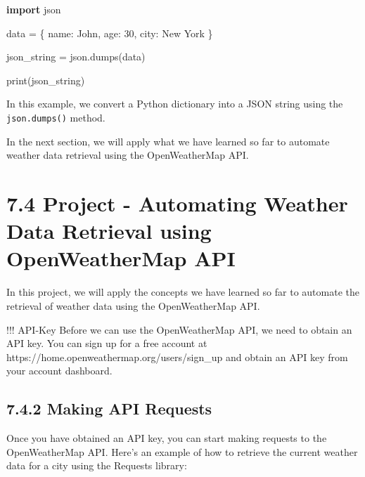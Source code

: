 \documentclass[
  paper=a4,
  ,captions=tableheading
]{scrartcl}
\newenvironment{Shaded}{}{}
\newcommand{\BuiltInTok}[1]{\textcolor[rgb]{0.00,0.50,0.00}{#1}}
\newcommand{\DecValTok}[1]{\textcolor[rgb]{0.25,0.63,0.44}{#1}}
\newcommand{\ImportTok}[1]{\textcolor[rgb]{0.00,0.50,0.00}{\textbf{#1}}}
\newcommand{\NormalTok}[1]{#1}
\newcommand{\OperatorTok}[1]{\textcolor[rgb]{0.40,0.40,0.40}{#1}}
\newcommand{\StringTok}[1]{\textcolor[rgb]{0.25,0.44,0.63}{#1}}
\begin{document}
\begin{Shaded}
\begin{Highlighting}[]
\ImportTok{import}\NormalTok{ json}

\NormalTok{data }\OperatorTok{=}\NormalTok{ \{}
    \StringTok{\textquotesingle{}name\textquotesingle{}}\NormalTok{: }\StringTok{\textquotesingle{}John\textquotesingle{}}\NormalTok{,}
    \StringTok{\textquotesingle{}age\textquotesingle{}}\NormalTok{: }\DecValTok{30}\NormalTok{,}
    \StringTok{\textquotesingle{}city\textquotesingle{}}\NormalTok{: }\StringTok{\textquotesingle{}New York\textquotesingle{}}
\NormalTok{\}}

\NormalTok{json\_string }\OperatorTok{=}\NormalTok{ json.dumps(data)}

\BuiltInTok{print}\NormalTok{(json\_string)}
\end{Highlighting}
\end{Shaded}

In this example, we convert a Python dictionary into a JSON string using
the \texttt{json.dumps()} method.

In the next section, we will apply what we have learned so far to
automate weather data retrieval using the OpenWeatherMap API.

\hypertarget{project---automating-weather-data-retrieval-using-openweathermap-api}{%
\section{7.4 Project - Automating Weather Data Retrieval using
OpenWeatherMap
API}\label{project---automating-weather-data-retrieval-using-openweathermap-api}}

In this project, we will apply the concepts we have learned so far to
automate the retrieval of weather data using the OpenWeatherMap API.

!!! API-Key Before we can use the OpenWeatherMap API, we need to obtain
an API key. You can sign up for a free account at
https://home.openweathermap.org/users/sign\_up and obtain an API key
from your account dashboard.

\hypertarget{making-api-requests}{%
\subsection{7.4.2 Making API Requests}\label{making-api-requests}}

Once you have obtained an API key, you can start making requests to the
OpenWeatherMap API. Here's an example of how to retrieve the current
weather data for a city using the Requests library:
\end{document}

